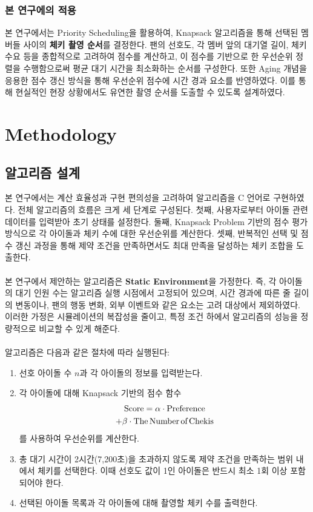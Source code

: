 \documentclass[12pt,hidelinks]{article}
\begin{document}
\subsubsection{본 연구에의 적용}
본 연구에서는 Priority Scheduling을 활용하여, Knapsack 알고리즘을 통해 선택된 멤버들 사이의 \textbf{체키 촬영 순서}를 결정한다. 팬의 선호도, 각 멤버 앞의 대기열 길이, 체키 수요 등을 종합적으로 고려하여 점수를 계산하고, 이 점수를 기반으로 한 우선순위 정렬을 수행함으로써 평균 대기 시간을 최소화하는 순서를 구성한다. 또한 Aging 개념을 응용한 점수 갱신 방식을 통해 우선순위 점수에 시간 경과 요소를 반영하였다. 이를 통해 현실적인 현장 상황에서도 유연한 촬영 순서를 도출할 수 있도록 설계하였다.

\section{Methodology}
\subsection{알고리즘 설계}
본 연구에서는 계산 효율성과 구현 편의성을 고려하여 알고리즘을 C 언어로 구현하였다. 전체 알고리즘의 흐름은 크게 세 단계로 구성된다. 첫째, 사용자로부터 아이돌 관련 데이터를 입력받아 초기 상태를 설정한다. 둘째, Knapsack Problem 기반의 점수 평가 방식으로 각 아이돌과 체키 수에 대한 우선순위를 계산한다. 셋째, 반복적인 선택 및 점수 갱신 과정을 통해 제약 조건을 만족하면서도 최대 만족을 달성하는 체키 조합을 도출한다.
\\
\\
본 연구에서 제안하는 알고리즘은 \textbf{Static Environment}을 가정한다. 즉, 각 아이돌의 대기 인원 수는 알고리즘 실행 시점에서 고정되어 있으며, 시간 경과에 따른 줄 길이의 변동이나, 팬의 행동 변화, 외부 이벤트와 같은 요소는 고려 대상에서 제외하였다. 이러한 가정은 시뮬레이션의 복잡성을 줄이고, 특정 조건 하에서 알고리즘의 성능을 정량적으로 비교할 수 있게 해준다.
\\
\\
알고리즘은 다음과 같은 절차에 따라 실행된다:

\begin{enumerate}
	\item 선호 아이돌 수 $n$과 각 아이돌의 정보를 입력받는다.
	\item 각 아이돌에 대해 Knapsack 기반의 점수 함수
	\begin{multline*} \text{Score} = \alpha \cdot \text{Preference} \\
	+ \beta \cdot \text{The\,Number\,of\,Chekis}
	\end{multline*}
	를 사용하여 우선순위를 계산한다.
	\item 총 대기 시간이 2시간(7,200초)을 초과하지 않도록 제약 조건을 만족하는 범위 내에서 체키를 선택한다. 이때 선호도 값이 1인 아이돌은 반드시 최소 1회 이상 포함되어야 한다.
	\item 선택된 아이돌 목록과 각 아이돌에 대해 촬영할 체키 수를 출력한다.
\end{enumerate}
\end{document}
